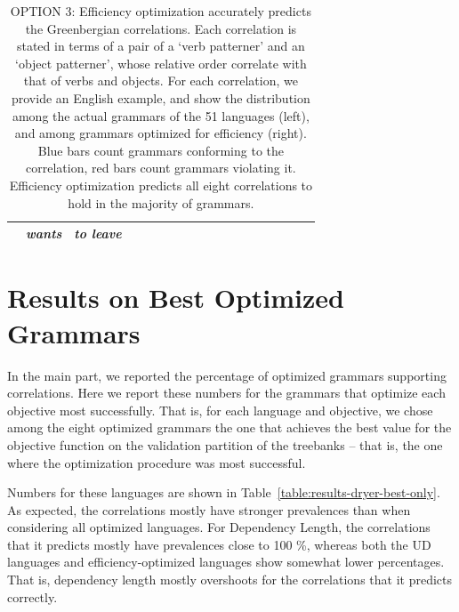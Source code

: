 \documentclass[12pt]{article}
\begin{document}
\begin{table}
\begin{center}
\begin{tabular}{c|ll|c|c|cc|ccccccccccc}
	& \emph{wants}   &  \emph{to leave}  &&&\\ \hline
 \hline
\end{tabular}
	\end{center}
\caption{OPTION 3: Efficiency optimization accurately predicts the Greenbergian correlations. Each correlation is stated in terms of a pair of a `verb patterner' and an `object patterner', whose relative order correlate with that of verbs and objects.
For each correlation, we provide an English example, and show the distribution among the actual grammars of the 51 languages (left), and among grammars optimized for efficiency (right).
Blue bars count grammars conforming to the correlation, red bars count grammars violating it.
Efficiency optimization predicts all eight correlations to hold in the majority of grammars.
}\label{table:corr-dryer}
\end{table}



\section{Results on Best Optimized Grammars}

In the main part, we reported the percentage of optimized grammars supporting correlations.
Here we report these numbers for the grammars that optimize each objective most successfully.
That is, for each language and objective, we chose among the eight optimized grammars the one that achieves the best value for the objective function on the validation partition of the treebanks -- that is, the one where the optimization procedure was most successful.

Numbers for these languages are shown in Table~\ref{table:results-dryer-best-only}.
As expected, the correlations mostly have stronger prevalences than when considering all optimized languages.
For Dependency Length, the correlations that it predicts mostly have prevalences close to 100 \%, whereas both the UD languages and efficiency-optimized languages show somewhat lower percentages.
That is, dependency length mostly overshoots for the correlations that it predicts correctly.
\end{document}
